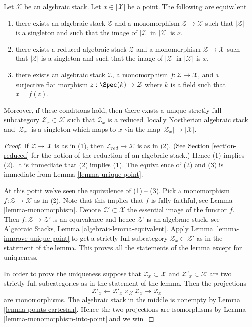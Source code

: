 \begin{lemma}
\label{lemma-residual-gerbe}
Let $\mathcal{X}$ be an algebraic stack. Let $x \in |\mathcal{X}|$ be a point.
The following are equivalent
\begin{enumerate}
\item there exists an algebraic stack $\mathcal{Z}$ and a monomorphism
$\mathcal{Z} \to \mathcal{X}$ such that $|\mathcal{Z}|$ is a singleton
and such that the image of $|\mathcal{Z}|$ in $|\mathcal{X}|$ is $x$,
\item there exists a reduced algebraic stack $\mathcal{Z}$ and a monomorphism
$\mathcal{Z} \to \mathcal{X}$ such that $|\mathcal{Z}|$ is a singleton
and such that the image of $|\mathcal{Z}|$ in $|\mathcal{X}|$ is $x$,
\item there exists an algebraic stack $\mathcal{Z}$, a monomorphism
$f : \mathcal{Z} \to \mathcal{X}$, and a surjective flat morphism
$z : \Spec(k) \to \mathcal{Z}$ where $k$ is a field such that
$x = f(z)$.
\end{enumerate}
Moreover, if these conditions hold, then there exists a unique
strictly full subcategory $\mathcal{Z}_x \subset \mathcal{X}$
such that $\mathcal{Z}_x$ is a reduced, locally Noetherian algebraic
stack and $|\mathcal{Z}_x|$ is a singleton which maps to $x$
via the map $|\mathcal{Z}_x| \to |\mathcal{X}|$.
\end{lemma}

\begin{proof}
If $\mathcal{Z} \to \mathcal{X}$ is as in (1), then
$\mathcal{Z}_{red} \to \mathcal{X}$ is as in (2). (See
Section \ref{section-reduced}
for the notion of the reduction of an algebraic stack.)
Hence (1) implies (2).
It is immediate that (2) implies (1).
The equivalence of (2) and (3) is immediate from
Lemma \ref{lemma-unique-point}.

\medskip\noindent
At this point we've seen the equivalence of (1) -- (3).
Pick a monomorphism $f : \mathcal{Z} \to \mathcal{X}$ as in (2).
Note that this implies that $f$ is fully faithful, see
Lemma \ref{lemma-monomorphism}.
Denote $\mathcal{Z}' \subset \mathcal{X}$ the essential image of the functor
$f$. Then $f : \mathcal{Z} \to \mathcal{Z}'$ is an equivalence and hence
$\mathcal{Z}'$ is an algebraic stack, see
Algebraic Stacks, Lemma \ref{algebraic-lemma-equivalent}.
Apply
Lemma \ref{lemma-improve-unique-point}
to get a strictly full subcategory $\mathcal{Z}_x \subset \mathcal{Z}'$
as in the statement of the lemma.
This proves all the statements of the lemma except for uniqueness.

\medskip\noindent
In order to prove the uniqueness suppose that
$\mathcal{Z}_x \subset \mathcal{X}$
and
$\mathcal{Z}'_x \subset \mathcal{X}$
are two strictly full subcategories as in the statement of the lemma.
Then the projections
$$
\mathcal{Z}'_x
\longleftarrow
\mathcal{Z}'_x \times_\mathcal{X} \mathcal{Z}_x
\longrightarrow
\mathcal{Z}_x
$$
are monomorphisms. The algebraic stack in the middle is nonempty by
Lemma \ref{lemma-points-cartesian}.
Hence the two projections are isomorphisms by
Lemma \ref{lemma-monomorphism-into-point}
and we win.
\end{proof}

